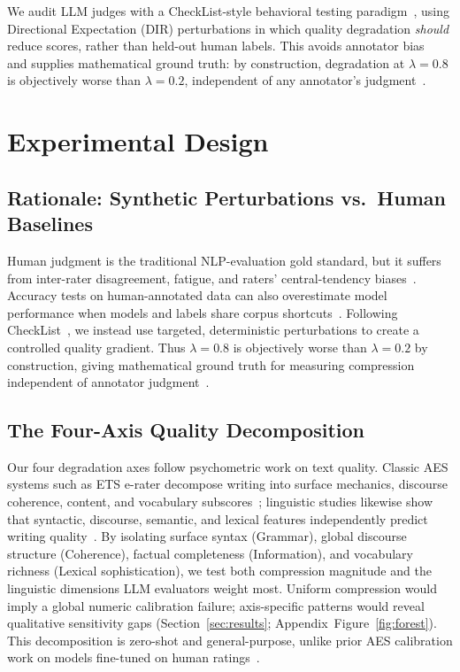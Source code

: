 \documentclass[11pt]{article}
\begin{document}
We audit LLM judges with a CheckList-style behavioral testing
paradigm~\citep{ribeiro2020beyond}, using Directional Expectation (DIR)
perturbations in which quality degradation \emph{should} reduce scores,
rather than held-out human labels. This avoids annotator
bias~\citep{stevens1971issues} and supplies mathematical ground truth:
by construction, degradation at $\lambda = 0.8$ is objectively worse than
$\lambda = 0.2$, independent of any annotator's
judgment~\citep{ribeiro2020beyond}.

\section{Experimental Design}
\label{sec:design}

\subsection{Rationale: Synthetic Perturbations vs.\ Human Baselines}
\label{sec:synthetic_justification}

Human judgment is the traditional NLP-evaluation gold standard, but it
suffers from inter-rater disagreement, fatigue, and raters'
central-tendency biases~\citep{stevens1971issues}. Accuracy tests on
human-annotated data can also overestimate model performance when
models and labels share corpus shortcuts~\citep{ribeiro2020beyond}.
Following CheckList~\citep{ribeiro2020beyond}, we instead use targeted,
deterministic perturbations to create a controlled quality gradient.
Thus $\lambda = 0.8$ is objectively worse than $\lambda = 0.2$ by
construction, giving mathematical ground truth for measuring compression
independent of annotator judgment~\citep{ribeiro2020beyond}.

\subsection{The Four-Axis Quality Decomposition}
\label{sec:axis_justification}

Our four degradation axes follow psychometric work on text quality.
Classic AES systems such as ETS e-rater decompose writing into surface
mechanics, discourse coherence, content, and vocabulary subscores~\citep{attali2006automated};
linguistic studies likewise show that syntactic, discourse, semantic,
and lexical features independently predict writing quality~\citep{mcnamara2010linguistic}.
By isolating surface syntax (Grammar), global discourse structure
(Coherence), factual completeness (Information), and vocabulary richness
(Lexical sophistication), we test both compression magnitude and the
linguistic dimensions LLM evaluators weight most. Uniform compression
would imply a global numeric calibration failure; axis-specific patterns
would reveal qualitative sensitivity gaps (Section~\ref{sec:results};
Appendix~Figure~\ref{fig:forest}). This decomposition is zero-shot and
general-purpose, unlike prior AES calibration work on models fine-tuned
on human ratings~\citep{ke2019automated}.
\end{document}
